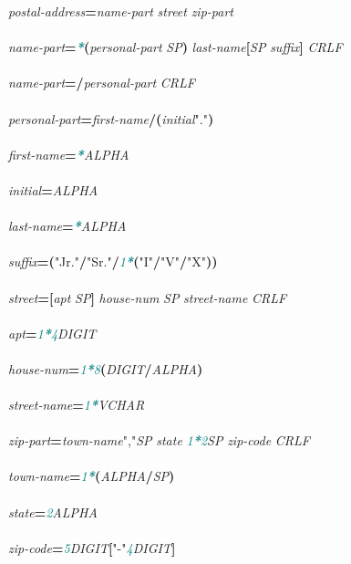 \documentclass{article}
\begin{document}
{\scriptsize\ttfamily
\emph{postal-{}address}\textbf{=}\emph{name-{}part} \emph{street} \emph{zip-{}part}\\
\\
\emph{name-{}part}\textbf{=}\textcolor{teal}{\emph{\textbf{*}}}\textbf{(}\emph{personal-{}part} \emph{SP}\textbf{)} \emph{last-{}name}\textbf{[}\emph{SP} \emph{suffix}\textbf{]} \emph{CRLF}\\
\\
\emph{name-{}part}\textbf{=/}\emph{personal-{}part} \emph{CRLF}\\
\\
\emph{personal-{}part}\textbf{=}\emph{first-{}name}\textbf{/}\textbf{(}\emph{initial}\textcolor{BrickRed}{"."}\textbf{)}\\
\\
\emph{first-{}name}\textbf{=}\textcolor{teal}{\emph{\textbf{*}}}\emph{ALPHA}\\
\\
\emph{initial}\textbf{=}\emph{ALPHA}\\
\\
\emph{last-{}name}\textbf{=}\textcolor{teal}{\emph{\textbf{*}}}\emph{ALPHA}\\
\\
\emph{suffix}\textbf{=}\textbf{(}\textcolor{BrickRed}{"Jr."}\textbf{/}\textcolor{BrickRed}{"Sr."}\textbf{/}\textcolor{teal}{\emph{1\textbf{*}}}\textbf{(}\textcolor{BrickRed}{"I"}\textbf{/}\textcolor{BrickRed}{"V"}\textbf{/}\textcolor{BrickRed}{"X"}\textbf{)}\textbf{)}\\
\\
\emph{street}\textbf{=}\textbf{[}\emph{apt} \emph{SP}\textbf{]} \emph{house-{}num} \emph{SP} \emph{street-{}name} \emph{CRLF}\\
\\
\emph{apt}\textbf{=}\textcolor{teal}{\emph{1\textbf{*}4}}\emph{DIGIT}\\
\\
\emph{house-{}num}\textbf{=}\textcolor{teal}{\emph{1\textbf{*}8}}\textbf{(}\emph{DIGIT}\textbf{/}\emph{ALPHA}\textbf{)}\\
\\
\emph{street-{}name}\textbf{=}\textcolor{teal}{\emph{1\textbf{*}}}\emph{VCHAR}\\
\\
\emph{zip-{}part}\textbf{=}\emph{town-{}name}\textcolor{BrickRed}{","}\emph{SP} \emph{state} \textcolor{teal}{\emph{1\textbf{*}2}}\emph{SP} \emph{zip-{}code} \emph{CRLF}\\
\\
\emph{town-{}name}\textbf{=}\textcolor{teal}{\emph{1\textbf{*}}}\textbf{(}\emph{ALPHA}\textbf{/}\emph{SP}\textbf{)}\\
\\
\emph{state}\textbf{=}\textcolor{teal}{\emph{2}}\emph{ALPHA}\\
\\
\emph{zip-{}code}\textbf{=}\textcolor{teal}{\emph{5}}\emph{DIGIT}\textbf{[}\textcolor{BrickRed}{"-{}"}\textcolor{teal}{\emph{4}}\emph{DIGIT}\textbf{]}\\

}
\end{document}
